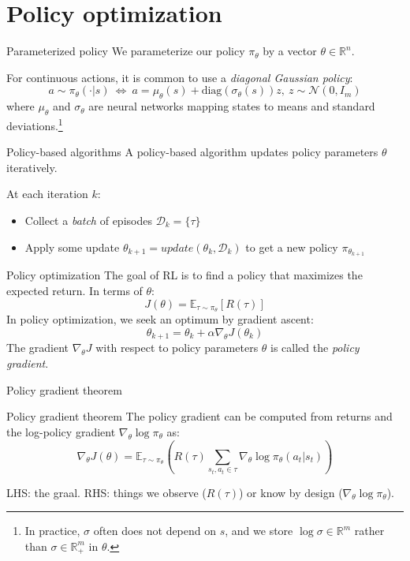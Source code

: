 \documentclass[10pt, aspectratio=1610]{beamer}
\begin{document}
\section{Policy optimization}

\begin{frame}{Parameterized policy}
    We parameterize our policy $\pi_\theta$ by a vector $\theta \in \mathbb{R}^n$.

    For continuous actions, it is common to use a \emph{diagonal Gaussian policy}:
    \[
        a \sim \pi_\theta(\cdot|s) \ \Longleftrightarrow \ a = \mu_\theta(s) + \mathrm{diag}(\sigma_\theta(s)) z, \ z \sim \mathcal{N}(0, I_m)
    \]
    where $\mu_\theta$ and $\sigma_\theta$ are neural networks mapping states to means and standard deviations.\footnote{In practice, $\sigma$ often does not depend on $s$, and we store $\log \sigma \in \mathbb{R}^m$ rather than $\sigma \in \mathbb{R}^m_+$ in $\theta$.}
\end{frame}

\begin{frame}{Policy-based algorithms}
    A policy-based algorithm updates policy parameters $\theta$ iteratively.

    At each iteration $k$:
    \begin{itemize}
        \item Collect a \emph{batch} of episodes $\mathcal{D}_k = \{ \tau \}$
        \item Apply some update $\theta_{k+1} = \mathit{update}(\theta_k, \mathcal{D}_k)$ to get a new policy $\pi_{\theta_{k+1}}$
    \end{itemize}
\end{frame}

\begin{frame}{Policy optimization}
    The goal of RL is to find a policy that maximizes the expected return. In terms of $\theta$:
    $$
    J(\theta) = \mathbb{E}_{\tau \sim \pi_\theta}[R(\tau)]
    $$
    In policy optimization, we seek an optimum by gradient ascent:
    $$
    \theta_{k+1} = \theta_k + \alpha \nabla_\theta J(\theta_k)
    $$
    The gradient $\nabla_\theta J$ with respect to policy parameters $\theta$ is called the \emph{policy gradient}.
\end{frame}

\begin{frame}{Policy gradient theorem}
    \begin{block}{Policy gradient theorem}
        The policy gradient can be computed from returns and the log-policy gradient $\nabla_\theta \log \pi_\theta$ as:
        \begin{equation*}
            \nabla_\theta J(\theta) = \mathbb{E}_{\tau \sim \pi_\theta} \left(
            R(\tau)
            \sum_{s_t, a_t \in \tau} \nabla_\theta \log \pi_\theta(a_t | s_t)
            \right)
        \end{equation*}
    \end{block}
    LHS: the graal. RHS: things we observe ($R(\tau)$) or know by design ($\nabla_\theta \log \pi_\theta$).
\end{frame}
\end{document}
